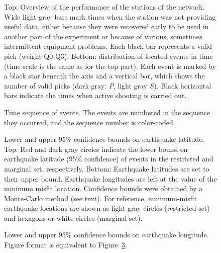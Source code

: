 \documentclass[jgr]{aguplus}
\newlength{\tw}
\begin{document}
\begin{figure}


\caption{Top: Overview of the performance of the stations of the network.
Wide light gray bars mark times when the station was not providing
useful data, either because they were recovered early to be used in
another part of the experiment or because of various, sometimes
intermittent equipment problems.  Each black bar represents a valid
pick (weight Q0-Q3).  Bottom: distribution of located events in time
(time scale is the same as for the top part).  Each event is marked by
a black star beneath the axis and a
vertical bar, which shows the number of valid picks (dark gray: $P$, light
gray $S$).  Black horizontal bars indicate the times when active
shooting is carried out.}
\label{fig:timeline}
\end{figure}

\begin{figure}


\caption{Time sequence of events.  The events are numbered in the
sequence they occurred, and the sequence number is color-coded.}
\label{fig:time-map}
\end{figure}


\begin{figure}



\caption{Lower and upper 95\% confidence bounds on earthquake
latitude.   Top: Red and dark gray circles
indicate the lower bound on earthquake latitude (95\% confidence) of
events in the restricted and marginal set, respectively.
Bottom: Earthquake latitudes are set to their upper bound.
Earthquake longitudes are left at the value of the minimum misfit
location.  Confidence bounds were obtained by a Monte-Carlo method
(see text). For reference, minimum-misfit earthquake locations are shown as
 light gray circles  (restricted set) and hexagons or white circles
(marginal set). }
\label{fig:map95lat}
\end{figure}


\begin{figure}



\caption{Lower and upper 95\% confidence bounds on earthquake
longitude.  Figure format is equivalent to Figure~\ref{fig:map95lat}. }
\label{fig:map95lon}
\end{figure}
\end{document}
